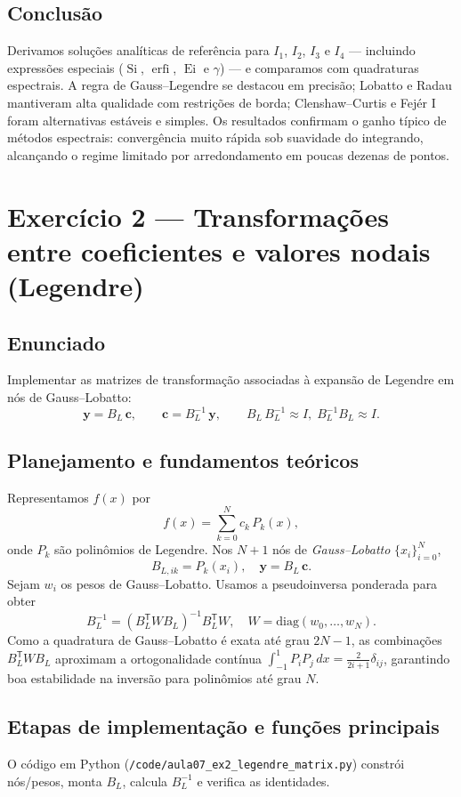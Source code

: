 \documentclass[12pt,a4paper]{article}
\begin{document}
\subsection{Conclusão}
Derivamos soluções analíticas de referência para $I_1$, $I_2$, $I_3$ e $I_4$ — incluindo expressões especiais ($\operatorname{Si}$, $\operatorname{erfi}$, $\operatorname{Ei}$ e $\gamma$) — e comparamos com quadraturas espectrais.  
A regra de Gauss–Legendre se destacou em precisão; Lobatto e Radau mantiveram alta qualidade com restrições de borda; Clenshaw–Curtis e Fejér I foram alternativas estáveis e simples.  
Os resultados confirmam o ganho típico de métodos espectrais: convergência muito rápida sob suavidade do integrando, alcançando o regime limitado por arredondamento em poucas dezenas de pontos.


\section{Exercício 2 — Transformações entre coeficientes e valores nodais (Legendre)}

\subsection{Enunciado}
Implementar as matrizes de transformação associadas à expansão de Legendre em nós de Gauss–Lobatto:
\[
\mathbf{y} = B_L\,\mathbf{c}, 
\qquad 
\mathbf{c} = B_L^{-1}\,\mathbf{y},
\qquad
B_L\,B_L^{-1} \approx I, \;
B_L^{-1} B_L \approx I.
\]

\subsection{Planejamento e fundamentos teóricos}
Representamos \(f(x)\) por
\[
f(x) = \sum_{k=0}^{N} c_k\,P_k(x),
\]
onde \(P_k\) são polinômios de Legendre. Nos \(N{+}1\) nós de \emph{Gauss–Lobatto} \(\{x_i\}_{i=0}^{N}\),
\[
B_{L,ik} = P_k(x_i),
\quad
\mathbf{y} = B_L\,\mathbf{c}.
\]
Sejam \(w_i\) os pesos de Gauss–Lobatto. Usamos a pseudoinversa ponderada para obter
\[
B_L^{-1} = (B_L^{\mathsf T} W B_L)^{-1} B_L^{\mathsf T} W,
\quad
W=\mathrm{diag}(w_0,\ldots,w_N).
\]
Como a quadratura de Gauss–Lobatto é exata até grau \(2N{-}1\), as combinações \(B_L^{\mathsf T}WB_L\) aproximam a ortogonalidade contínua \(\int_{-1}^{1} P_i P_j\,dx = \tfrac{2}{2i+1}\delta_{ij}\), garantindo boa estabilidade na inversão para polinômios até grau \(N\).

\subsection{Etapas de implementação e funções principais}
O código em Python (\texttt{/code/aula07\_ex2\_legendre\_matrix.py}) constrói nós/pesos, monta \(B_L\), calcula \(B_L^{-1}\) e verifica as identidades.
\end{document}
